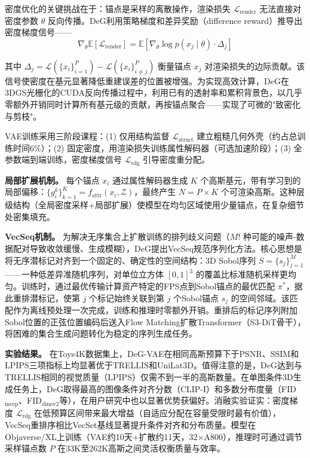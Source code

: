 密度优化的关键挑战在于：锚点是采样的离散操作，渲染损失 $\mathcal{L}_\text{render}$ 无法直接对密度参数 $\theta$ 反向传播。DeG利用策略梯度和差异奖励（difference reward）推导出密度梯度信号——
\begin{equation}
\nabla_\theta \mathbb{E}[\mathcal{L}_\text{render}] = \mathbb{E}\left[\nabla_\theta \log p(x_j \mid \theta) \cdot \Delta_j\right]
\end{equation}

其中 $\Delta_j = \mathcal{L}(\{x_i\}_{i=1}^{P}) - \mathcal{L}(\{x_i\}_{i \neq j}^{P})$ 衡量锚点 $x_j$ 对渲染损失的边际贡献。该信号使密度在基元显著降低重建误差的位置被增强。为实现高效计算，DeG在3DGS光栅化的CUDA反向传播过程中，利用已有的透射率和累积背景色，以几乎零额外开销同时计算所有基元级的贡献，再按锚点聚合——实现了可微的"致密化与剪枝"。

VAE训练采用三阶段课程：(1) 仅用结构监督 $\mathcal{L}_\text{struct}$ 建立粗糙几何外壳（约占总训练时间6\%）；(2) 固定密度，用渲染损失训练属性解码器（可选加速阶段）；(3) 全参数端到端训练，密度梯度信号 $\mathcal{L}_\text{rdg}$ 引导密度重分配。

\textbf{局部扩展机制。}
每个锚点 $x_i$ 通过属性解码器生成 $K$ 个高斯基元，带有学习到的局部偏移：$\{g_i^k\}_{k=1}^{K} = f_\text{attr}(x_i, \mathcal{Z})$，最终产生 $N = P \times K$ 个可渲染高斯。这种层级结构（全局密度采样+局部扩展）使模型在均匀区域使用少量锚点，在复杂细节处密集填充。

\textbf{VecSeq机制。}
为解决无序集合上扩散训练的排列歧义问题（$M!$ 种可能的噪声-数据配对导致收敛缓慢、生成模糊），DeG提出VecSeq规范序列化方法。核心思想是将无序潜标记对齐到一个固定的、确定性的空间结构：3D Sobol序列 $S = \{s_j\}_{j=1}^{M}$——一种低差异准随机序列，对单位立方体 $[0,1]^3$ 的覆盖比标准随机采样更均匀。训练时，通过最优传输计算资产特定的FPS点到Sobol锚点的最优匹配 $\pi^*$，据此重排潜标记，使第 $j$ 个标记始终关联到第 $j$ 个Sobol锚点 $s_j$ 的空间邻域。该匹配作为离线预处理一次完成，训练和推理时零额外开销。重排后的标记序列附加Sobol位置的正弦位置编码后送入Flow Matching扩散Transformer（S3-DiT骨干），将困难的集合生成问题转化为稳定的序列生成任务。

\textbf{实验结果。}
在Toys4K数据集上，DeG-VAE在相同高斯预算下于PSNR、SSIM和LPIPS三项指标上均显著优于TRELLIS和UniLat3D。值得注意的是，DeG达到与TRELLIS相同的视觉质量（LPIPS）仅需不到一半的高斯数量。在单图条件3D生成任务上，DeG取得最高的图像条件对齐分数（CLIP-I）和多数分布度量（FID$_\text{incep}$、FID$_\text{dinov2}$等），在用户研究中也以显著优势获偏好。消融实验证实：密度梯度 $\mathcal{L}_\text{rdg}$ 在低预算区间带来最大增益（自适应分配在容量受限时最有价值），VecSeq重排序相比VecSet基线显著提升条件对齐和分布质量。模型在Objaverse/XL上训练（VAE约10天+扩散约11天，32×A800），推理时可通过调节采样锚点数 $P$ 在33K至262K高斯之间灵活权衡质量与效率。

